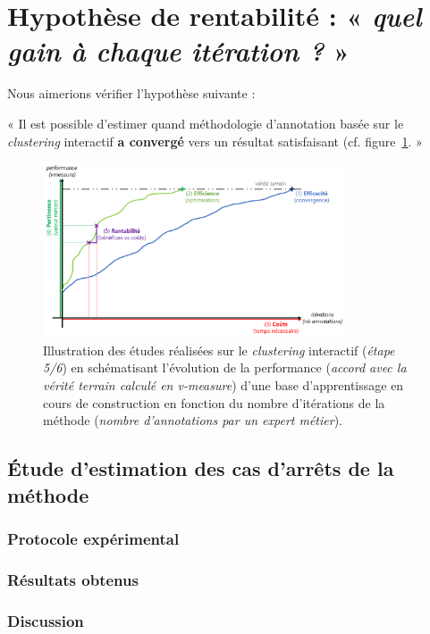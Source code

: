 \section{Hypothèse de rentabilité : « \textit{quel gain à chaque itération ?} »}
\label{section:4.5-HYPOTHESE-RENTABILITE}

	Nous aimerions vérifier l'hypothèse suivante :

	\begin{tcolorbox}[
		title=\faVial~\textbf{Hypothèse de rentabilité}~\faVial,
		colback=colorTcolorboxHypothesis!15,  %
		colframe=colorTcolorboxHypothesis!75,  %
		width=\linewidth
	]
		« Il est possible d'estimer quand méthodologie d'annotation basée sur le \textit{clustering} interactif \textbf{a convergé} vers un résultat satisfaisant (cf. figure~\ref{figure:4.5-HYPOTHESE-RENTABILITE}. »
		
		
		\begin{figure}[H]  %
			\centering
			\includegraphics[width=0.8\textwidth]{figures/hypotheses-05-rentabilite}
			\caption{Illustration des études réalisées sur le \textit{clustering} interactif (\textit{étape 5/6}) en schématisant l'évolution de la performance (\textit{accord avec la vérité terrain calculé en v-measure}) d'une base d'apprentissage en cours de construction en fonction du nombre d'itérations de la méthode (\textit{nombre d'annotations par un expert métier}).}
			\label{figure:4.5-HYPOTHESE-RENTABILITE}
		\end{figure}

	\end{tcolorbox}
	
	\subsection{Étude d'estimation des cas d'arrêts de la méthode}
	
		\subsubsection{Protocole expérimental}

		\subsubsection{Résultats obtenus}

		\subsubsection{Discussion}